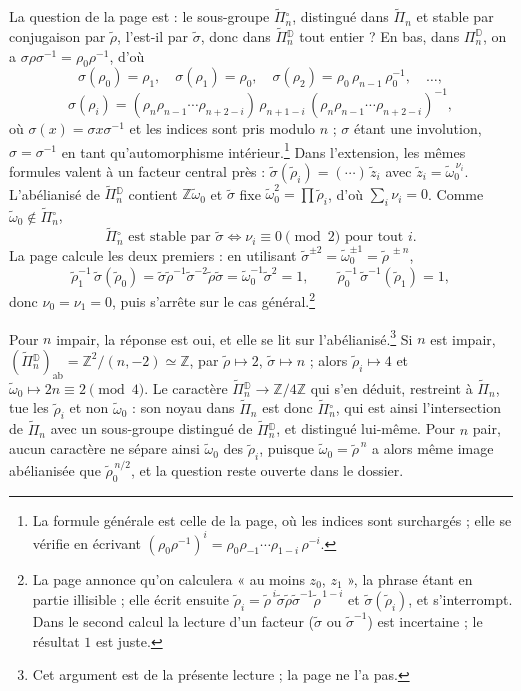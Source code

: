 \documentclass[11pt,a4paper]{article}
\begin{document}
La question de la page est : le sous-groupe $\widetilde{\Pi}{}^{\circ}_n$, distingué
dans $\widetilde{\Pi}_n$ et stable par conjugaison par $\tilde\rho$, l'est-il par
$\tilde\sigma$, donc dans $\widetilde{\Pi}{}^{\mathbb{D}}_n$ tout entier ? En bas,
dans $\Pi^{\mathbb{D}}_n$, on a $\sigma\rho\sigma^{-1} = \rho_0\rho^{-1}$, d'où
\[
\sigma(\rho_0) = \rho_1, \quad \sigma(\rho_1) = \rho_0, \quad
\sigma(\rho_2) = \rho_0\,\rho_{n-1}\,\rho_0^{-1}, \quad \dots,
\]
\[
\sigma(\rho_i) = (\rho_n\rho_{n-1}\cdots\rho_{n+2-i})\,\rho_{n+1-i}\,
(\rho_n\rho_{n-1}\cdots\rho_{n+2-i})^{-1} ,
\]
où $\sigma(x) = \sigma x \sigma^{-1}$ et les indices sont pris modulo $n$ ;
$\sigma$ étant une involution, $\sigma = \sigma^{-1}$ en tant qu'automorphisme
intérieur.\footnote{La formule générale est celle de la page, où les indices
sont surchargés ; elle se vérifie en écrivant
$(\rho_0\rho^{-1})^i = \rho_0\rho_{-1}\cdots\rho_{1-i}\,\rho^{-i}$.} Dans
l'extension, les mêmes formules valent à un facteur central près :
$\tilde\sigma(\tilde\rho_i) = (\cdots)\,\tilde z_i$ avec
$\tilde z_i = \tilde\omega_0^{\,\nu_i}$. L'abélianisé de
$\widetilde{\Pi}{}^{\mathbb{D}}_n$ contient $\mathbb{Z}\tilde\omega_0$ et
$\tilde\sigma$ fixe $\tilde\omega_0^2 = \prod\tilde\rho_i$, d'où
$\sum_i \nu_i = 0$. Comme $\tilde\omega_0 \notin \widetilde{\Pi}{}^{\circ}_n$,
\[
\widetilde{\Pi}{}^{\circ}_n \text{ est stable par } \tilde\sigma
\iff \nu_i \equiv 0 \pmod 2 \text{ pour tout } i .
\]
La page calcule les deux premiers : en utilisant $\tilde\sigma^{\pm 2} =
\tilde\omega_0^{\pm1} = \tilde\rho^{\,\pm n}$,
\[
\tilde\rho_1^{-1}\,\tilde\sigma(\tilde\rho_0)
= \tilde\sigma\tilde\rho^{-1}\tilde\sigma^{-2}\tilde\rho\tilde\sigma
= \tilde\omega_0^{-1}\tilde\sigma^{2} = 1,
\qquad
\tilde\rho_0^{-1}\,\tilde\sigma^{-1}(\tilde\rho_1) = 1 ,
\]
donc $\nu_0 = \nu_1 = 0$, puis s'arrête sur le cas général.\footnote{La page
annonce qu'on calculera « au moins $z_0$, $z_1$ », la phrase étant en partie
illisible ; elle écrit ensuite $\tilde\rho_i = \tilde\rho^{\,i}\tilde\sigma
\tilde\rho\tilde\sigma^{-1}\tilde\rho^{\,1-i}$ et $\tilde\sigma(\tilde\rho_i)$, et
s'interrompt. Dans le second calcul la lecture d'un facteur ($\tilde\sigma$ ou
$\tilde\sigma^{-1}$) est incertaine ; le résultat $1$ est juste.}

Pour $n$ impair, la réponse est oui, et elle se lit sur l'abélianisé.\footnote{Cet
argument est de la présente lecture ; la page ne l'a pas.} Si $n$ est impair,
$(\widetilde{\Pi}{}^{\mathbb{D}}_n)_{\mathrm{ab}} = \mathbb{Z}^2/(n, -2) \simeq
\mathbb{Z}$, par $\tilde\rho \mapsto 2$, $\tilde\sigma \mapsto n$ ; alors
$\tilde\rho_i \mapsto 4$ et $\tilde\omega_0 \mapsto 2n \equiv 2 \pmod 4$. Le
caractère $\widetilde{\Pi}{}^{\mathbb{D}}_n \to \mathbb{Z}/4\mathbb{Z}$ qui s'en
déduit, restreint à $\widetilde{\Pi}_n$, tue les $\tilde\rho_i$ et non
$\tilde\omega_0$ : son noyau dans $\widetilde{\Pi}_n$ est donc
$\widetilde{\Pi}{}^{\circ}_n$, qui est ainsi l'intersection de $\widetilde{\Pi}_n$ avec
un sous-groupe distingué de $\widetilde{\Pi}{}^{\mathbb{D}}_n$, et distingué
lui-même. Pour $n$ pair, aucun caractère ne sépare ainsi $\tilde\omega_0$ des
$\tilde\rho_i$, puisque $\tilde\omega_0 = \tilde\rho^{\,n}$ a alors même image
abélianisée que $\tilde\rho_0^{\,n/2}$, et la question reste ouverte dans le
dossier.
\end{document}
